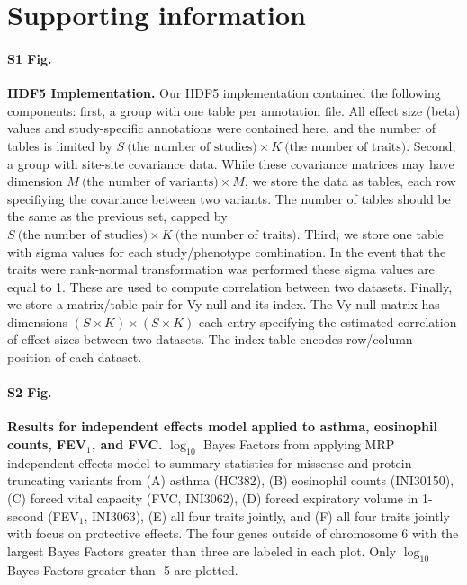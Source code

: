 \section*{Supporting information}

\paragraph*{S1 Fig.}
\label{hdf5_fig}
{\bf HDF5 Implementation.} Our HDF5 implementation contained the following components: first, a group with one table per annotation file. All effect size (beta) values and study-specific annotations were contained here, and the number of tables is limited by $S\ \textrm{(the number of studies)} \times K\ \textrm{(the number of traits)}$. Second, a group with site-site covariance data. While these covariance matrices may have dimension $M\ \textrm{(the number of variants)} \times M$, we store the data as tables, each row specifiying the covariance between two variants. The number of tables should be the same as the previous set, capped by $S\ \textrm{(the number of studies)} \times K\ \textrm{(the number of traits)}$. Third, we store one table with sigma values for each study/phenotype combination. In the event that the traits were rank-normal transformation was performed these sigma values are equal to 1. These are used to compute correlation between two datasets. Finally, we store a matrix/table pair for Vy null and its index. The Vy null matrix has dimensions $ (S \times K) \times (S \times K)$ each entry specifying the estimated correlation of effect sizes between two datasets. The index table encodes row/column position of each dataset.

\paragraph*{S2 Fig.}
\label{asthma_independent}
{\bf Results for independent effects model applied to asthma, eosinophil counts, FEV$_1$, and FVC.} $\log_{10}$ Bayes Factors from applying MRP independent effects model to summary statistics for missense and protein-truncating variants from (A) asthma (HC382), (B) eosinophil counts (INI30150), (C) forced vital capacity (FVC, INI3062), (D) forced expiratory volume in 1-second (FEV$_1$, INI3063), (E) all four traits jointly, and (F) all four traits jointly with focus on protective effects. The four genes outside of chromosome 6 with the largest Bayes Factors greater than three are labeled in each plot. Only $\log_{10}$ Bayes Factors greater than -5 are plotted.

